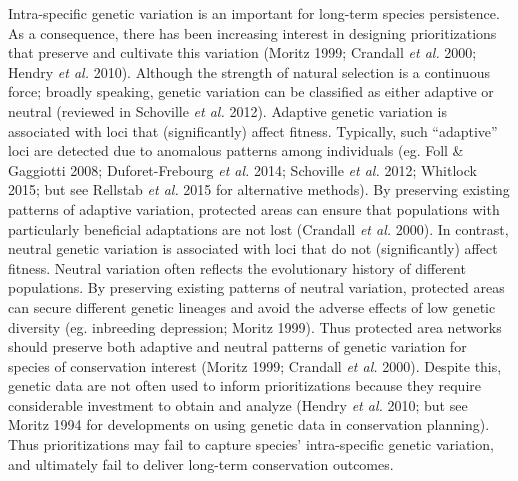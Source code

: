 \documentclass[11pt,]{article}
\begin{document}
Intra-specific genetic variation is an important for long-term species
persistence. As a consequence, there has been increasing interest in
designing prioritizations that preserve and cultivate this variation
(Moritz 1999; Crandall \emph{et al.} 2000; Hendry \emph{et al.} 2010).
Although the strength of natural selection is a continuous force;
broadly speaking, genetic variation can be classified as either adaptive
or neutral (reviewed in Schoville \emph{et al.} 2012). Adaptive genetic
variation is associated with loci that (significantly) affect fitness.
Typically, such ``adaptive'' loci are detected due to anomalous patterns
among individuals (eg. Foll \& Gaggiotti 2008; Duforet-Frebourg \emph{et
al.} 2014; Schoville \emph{et al.} 2012; Whitlock 2015; but see Rellstab
\emph{et al.} 2015 for alternative methods). By preserving existing
patterns of adaptive variation, protected areas can ensure that
populations with particularly beneficial adaptations are not lost
(Crandall \emph{et al.} 2000). In contrast, neutral genetic variation is
associated with loci that do not (significantly) affect fitness. Neutral
variation often reflects the evolutionary history of different
populations. By preserving existing patterns of neutral variation,
protected areas can secure different genetic lineages and avoid the
adverse effects of low genetic diversity (eg. inbreeding depression;
Moritz 1999). Thus protected area networks should preserve both adaptive
and neutral patterns of genetic variation for species of conservation
interest (Moritz 1999; Crandall \emph{et al.} 2000). Despite this,
genetic data are not often used to inform prioritizations because they
require considerable investment to obtain and analyze (Hendry \emph{et
al.} 2010; but see Moritz 1994 for developments on using genetic data in
conservation planning). Thus prioritizations may fail to capture
species' intra-specific genetic variation, and ultimately fail to
deliver long-term conservation outcomes.
\end{document}
